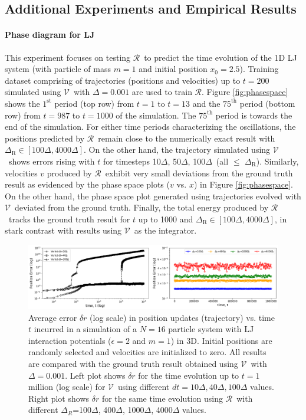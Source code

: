 \documentclass[aps,prl,twocolumn,superscriptaddress,tightenlines,longbibliography, reprint]{revtex4-1}
\newcommand{\dt}{$\Delta$}
\newcommand{\dtR}{$\Delta_{\textrm{R}}$}
\newcommand{\R}{$\mathscr{R}$}
\newcommand{\V}{$\mathscr{V}$}
\begin{document}
\subsection{Additional Experiments and Empirical Results}
\paragraph{Phase diagram for LJ}

This experiment focuses on testing \R\ to predict the time evolution of the 1D LJ system (with particle of mass $m=1$ and initial position $x_0=2.5$). Training dataset comprising of trajectories (positions and velocities) up to $t=200$ simulated using \V\ with \dt$=0.001$ are used to train \R. Figure \ref{fig:phasespace} shows the $1^{\mathrm{st}}$ period (top row) from $t=1$ to $t=13$ and the $75^{\mathrm{th}}$ period (bottom row) from $t=987$ to $t=1000$ of the simulation. The $ 75^{\mathrm{th}}$ period is towards the end of the simulation. For either time periods characterizing the oscillations, the positions predicted by \R\ remain close to the numerically exact result with $\Delta_{\textrm{R}} \in [100\Delta,4000\Delta]$. On the other hand, the trajectory simulated using \V\ shows errors rising with $t$ for timesteps 10\dt, 50\dt, 100\dt\ (all $\le$ \dtR).
Similarly, velocities $v$ produced by \R\ exhibit very small deviations from the ground truth result as evidenced by the phase space plots ($v$ vs. $x$) in Figure \ref{fig:phasespace}. On the other hand, the phase space plot generated using trajectories evolved with \V\ deviated from the ground truth. 
Finally, the total energy produced by \R\ tracks the ground truth result for $t$ up to 1000 and $\Delta_{\textrm{R}} \in [100\Delta,4000\Delta]$, in stark contrast with results using \V\ as the integrator.
\begin{figure}[htb]
\centering
\includegraphics[width=1.0\textwidth]{figures/fig9.png}
\caption{Average error $\delta r$ (log scale) in position updates (trajectory) vs. time $t$ incurred in a simulation of a $N=16$ particle system with LJ interaction potentials ($\epsilon=2$ and $m=1$) in 3D. Initial positions are randomly selected and velocities are initialized to zero. All results are compared with the ground truth result obtained using \V\ with $\Delta=0.001$. Left plot shows $\delta r$ for the time evolution up to $t=1$ million (log scale) for \V\ using different $dt=10\Delta, 40\Delta, 100\Delta$ values. Right plot shows $\delta r$ for the same time evolution using \R\ with different $\Delta_{R}$=100$\Delta$, 400$\Delta$, 1000$\Delta$, 4000$\Delta$ values. 
}
\label{fig:manyparticleSI}
\end{figure}
\end{document}

